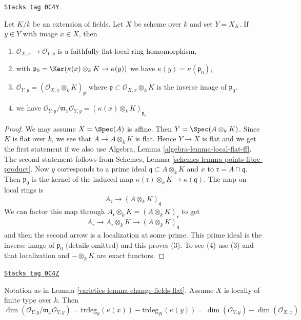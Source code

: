 \begin{lemma}
\label{varieties-lemma-change-fields-flat}
\href{https://stacks.math.columbia.edu/tag/0C4Y}{\texttt{Stacks tag 0C4Y}}

Let $K/k$ be an extension of fields. Let $X$ be scheme over $k$
and set $Y = X_K$. If $y \in Y$ with image $x \in X$, then
\begin{enumerate}
\item $\mathcal{O}_{X, x} \to \mathcal{O}_{Y, y}$ is a
faithfully flat local ring homomorphism,
\item with $\mathfrak p_0 = \Ker(\kappa(x) \otimes_k K \to \kappa(y))$
we have $\kappa(y) = \kappa(\mathfrak p_0)$,
\item $\mathcal{O}_{Y, y} = (\mathcal{O}_{X, x} \otimes_k K)_\mathfrak p$
where $\mathfrak p \subset \mathcal{O}_{X, x} \otimes_k K$ is the inverse
image of $\mathfrak p_0$.
\item we have
$\mathcal{O}_{Y, y}/\mathfrak m_x\mathcal{O}_{Y, y} =
(\kappa(x) \otimes_k K)_{\mathfrak p_0}$
\end{enumerate}
\end{lemma}

\begin{proof}
We may assume $X = \Spec(A)$ is affine. Then $Y = \Spec(A \otimes_k K)$.
Since $K$ is flat over $k$, we see that $A \to A \otimes_k K$ is flat.
Hence $Y \to X$ is flat and we get the first statement if we also
use Algebra, Lemma \ref{algebra-lemma-local-flat-ff}.
The second statement follows from
Schemes, Lemma \ref{schemes-lemma-points-fibre-product}.
Now $y$ corresponds to a prime ideal $\mathfrak q \subset A \otimes_k K$
and $x$ to $\mathfrak r = A \cap \mathfrak q$. Then $\mathfrak p_0$
is the kernel of the induced map
$\kappa(\mathfrak r) \otimes_k K \to \kappa(\mathfrak q)$.
The map on local rings is
$$
A_\mathfrak r \longrightarrow (A \otimes_k K)_\mathfrak q
$$
We can factor this map through
$A_\mathfrak r \otimes_k K = (A \otimes_k K)_{\mathfrak r}$
to get
$$
A_\mathfrak r \longrightarrow A_\mathfrak r \otimes_k K
\longrightarrow (A \otimes_k K)_\mathfrak q
$$
and then the second arrow is a localization at some prime. This prime ideal
is the inverse image of $\mathfrak p_0$ (details omitted) and this
proves (3). To see (4) use (3) and that localization and $- \otimes_k K$
are exact functors.
\end{proof}

\begin{lemma}
\label{varieties-lemma-change-fields-algebraic-dim}
\href{https://stacks.math.columbia.edu/tag/0C4Z}{\texttt{Stacks tag 0C4Z}}

Notation as in Lemma \ref{varieties-lemma-change-fields-flat}.
Assume $X$ is locally of finite type over $k$. Then
$$
\dim(\mathcal{O}_{Y, y}/\mathfrak m_x\mathcal{O}_{Y, y}) =
\text{trdeg}_k(\kappa(x)) - \text{trdeg}_K(\kappa(y)) =
\dim(\mathcal{O}_{Y, y}) - \dim(\mathcal{O}_{X, x})
$$
\end{lemma}

